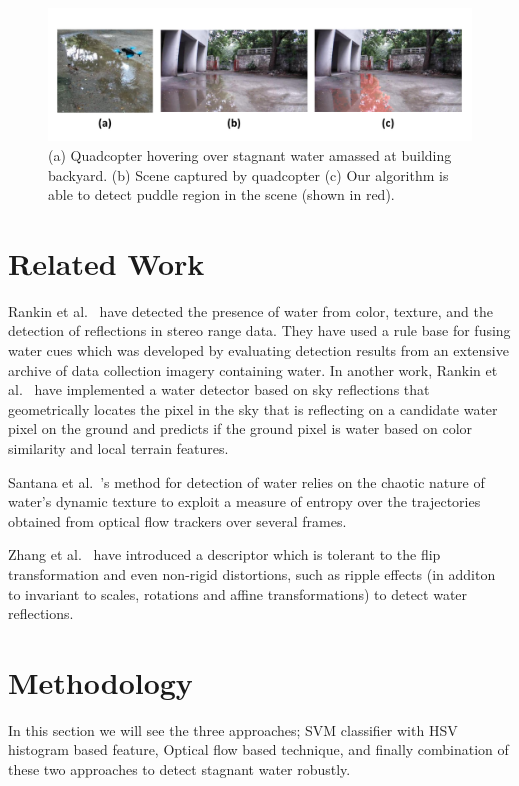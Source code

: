 \documentclass[times,10pt,twocolumn,letterpaper]{article}
\begin{document}
\begin{figure}[h!]
\centering
\includegraphics[width=\linewidth]{images/teaser.pdf}
\caption{(a) Quadcopter hovering over stagnant water amassed at building
backyard. (b) Scene captured by quadcopter (c) Our algorithm is able to detect
puddle region in the scene (shown in red).}
\end{figure}

\section{Related Work}

Rankin et al.~\cite{rankin04} have detected the presence of water from color,
texture, and the detection of reflections in stereo range data. They have used a
rule base for fusing water cues which was developed by evaluating detection
results from an extensive archive of data collection imagery containing water.
In another work, Rankin et al.~\cite{rankin11} have implemented a water detector
based on sky reflections that geometrically locates the pixel in the sky that
is reflecting on a candidate water pixel on the ground and predicts if the
ground pixel is water based on color similarity and local terrain features. 

Santana et al.~\cite{santana12}'s method for detection of water relies on the
chaotic nature of water’s dynamic texture to exploit a measure of entropy over the
trajectories obtained from optical flow trackers over several frames.

Zhang et al.~\cite{zhang10} have introduced a descriptor which is tolerant
to the flip transformation and even non-rigid distortions, such as ripple
effects (in additon to invariant to scales, rotations and affine
transformations) to detect water reflections.

\section{Methodology}
In this section we will see the three approaches; SVM classifier with HSV
histogram based feature, Optical flow based technique, and finally combination
of these two approaches to detect stagnant water robustly.
\end{document}
